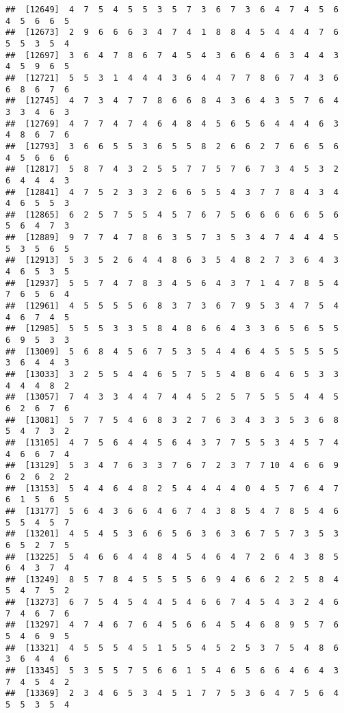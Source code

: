 \documentclass[
]{book}
\begin{document}
\begin{verbatim}
##  [12649]  4  7  5  4  5  5  3  5  7  3  6  7  3  6  4  7  4  5  6  4  5  6  6  5
##  [12673]  2  9  6  6  6  3  4  7  4  1  8  8  4  5  4  4  4  7  6  5  5  3  5  4
##  [12697]  3  6  4  7  8  6  7  4  5  4  3  6  6  4  6  3  4  4  3  4  5  9  6  5
##  [12721]  5  5  3  1  4  4  4  3  6  4  4  7  7  8  6  7  4  3  6  6  8  6  7  6
##  [12745]  4  7  3  4  7  7  8  6  6  8  4  3  6  4  3  5  7  6  4  3  3  4  6  3
##  [12769]  4  7  7  4  7  4  6  4  8  4  5  6  5  6  4  4  4  6  3  4  8  6  7  6
##  [12793]  3  6  6  5  5  3  6  5  5  8  2  6  6  2  7  6  6  5  6  4  5  6  6  6
##  [12817]  5  8  7  4  3  2  5  5  7  7  5  7  6  7  3  4  5  3  2  6  4  4  4  3
##  [12841]  4  7  5  2  3  3  2  6  6  5  5  4  3  7  7  8  4  3  4  4  6  5  5  3
##  [12865]  6  2  5  7  5  5  4  5  7  6  7  5  6  6  6  6  6  5  6  5  6  4  7  3
##  [12889]  9  7  7  4  7  8  6  3  5  7  3  5  3  4  7  4  4  4  5  5  3  5  6  5
##  [12913]  5  3  5  2  6  4  4  8  6  3  5  4  8  2  7  3  6  4  3  4  6  5  3  5
##  [12937]  5  5  7  4  7  8  3  4  5  6  4  3  7  1  4  7  8  5  4  7  6  5  6  4
##  [12961]  4  5  5  5  5  6  8  3  7  3  6  7  9  5  3  4  7  5  4  4  6  7  4  5
##  [12985]  5  5  5  3  3  5  8  4  8  6  6  4  3  3  6  5  6  5  5  6  9  5  3  3
##  [13009]  5  6  8  4  5  6  7  5  3  5  4  4  6  4  5  5  5  5  5  3  6  4  4  3
##  [13033]  3  2  5  5  4  4  6  5  7  5  5  4  8  6  4  6  5  3  3  4  4  4  8  2
##  [13057]  7  4  3  3  4  4  7  4  4  5  2  5  7  5  5  5  4  4  5  6  2  6  7  6
##  [13081]  5  7  7  5  4  6  8  3  2  7  6  3  4  3  3  5  3  6  8  5  4  7  3  2
##  [13105]  4  7  5  6  4  4  5  6  4  3  7  7  5  5  3  4  5  7  4  4  6  6  7  4
##  [13129]  5  3  4  7  6  3  3  7  6  7  2  3  7  7 10  4  6  6  9  6  2  6  2  2
##  [13153]  5  4  4  6  4  8  2  5  4  4  4  4  0  4  5  7  6  4  7  6  1  5  6  5
##  [13177]  5  6  4  3  6  6  4  6  7  4  3  8  5  4  7  8  5  4  6  5  5  4  5  7
##  [13201]  4  5  4  5  3  6  6  5  6  3  6  3  6  7  5  7  3  5  3  6  5  2  7  5
##  [13225]  5  4  6  6  4  4  8  4  5  4  6  4  7  2  6  4  3  8  5  6  4  3  7  4
##  [13249]  8  5  7  8  4  5  5  5  5  6  9  4  6  6  2  2  5  8  4  5  4  7  5  2
##  [13273]  6  7  5  4  5  4  4  5  4  6  6  7  4  5  4  3  2  4  6  7  4  6  7  6
##  [13297]  4  7  4  6  7  6  4  5  6  6  4  5  4  6  8  9  5  7  6  5  4  6  9  5
##  [13321]  4  5  5  5  4  5  1  5  5  4  5  2  5  3  7  5  4  8  6  3  6  4  4  6
##  [13345]  5  3  5  5  7  5  6  6  1  5  4  6  5  6  6  4  6  4  3  7  4  5  4  2
##  [13369]  2  3  4  6  5  3  4  5  1  7  7  5  3  6  4  7  5  6  4  5  5  3  5  4

\end{verbatim}
\end{document}
